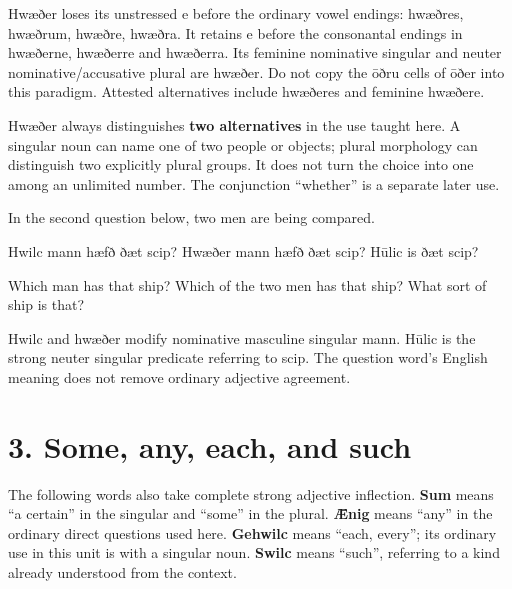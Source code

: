 Hwæðer loses its unstressed e before the ordinary vowel endings: hwæðres, hwæðrum, hwæðre, hwæðra. It retains e before the consonantal endings in hwæðerne, hwæðerre and hwæðerra. Its feminine nominative singular and neuter nominative/\allowbreak{}accusative plural are hwæðer. Do not copy the ōðru cells of ōðer into this paradigm. Attested alternatives include hwæðeres and feminine hwæðere.

Hwæðer always distinguishes \textbf{two alternatives} in the use taught here. A singular noun can name one of two people or objects; plural morphology can distinguish two explicitly plural groups. It does not turn the choice into one among an unlimited number. The conjunction “whether” is a separate later use.

In the second question below, two men are being compared.

Hwilc mann hæfð ðæt scip? Hwæðer mann hæfð ðæt scip? Hūlic is ðæt scip?

Which man has that ship? Which of the two men has that ship? What sort of ship is that?

Hwilc and hwæðer modify nominative masculine singular mann. Hūlic is the strong neuter singular predicate referring to scip. The question word’s English meaning does not remove ordinary adjective agreement.

\section*{3. Some, any, each, and such}

The following words also take complete strong adjective inflection. \textbf{Sum} means “a certain” in the singular and “some” in the plural. \textbf{Ǣnig} means “any” in the ordinary direct questions used here. \textbf{Gehwilc} means “each, every”; its ordinary use in this unit is with a singular noun. \textbf{Swilc} means “such”, referring to a kind already understood from the context.

